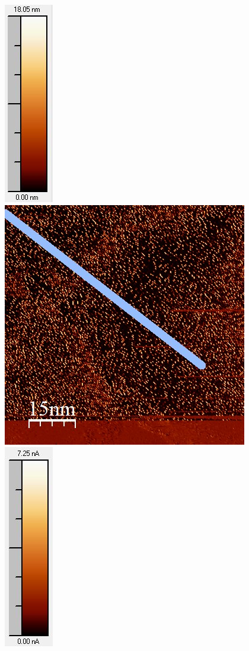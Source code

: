 \documentclass[12pt,a4paper]{article}
\begin{document}
\begin{figure}[H]
\includegraphics[scale=0.6]{Bilder/Anhang/IGain/11000_IGain_nach_Skala.jpg}
\includegraphics[scale=0.6]{Bilder/Anhang/IGain/Strom/11000_IGain_Strom_vor.jpg}
\includegraphics[scale=0.6]{Bilder/Anhang/IGain/Strom/11000_IGain_Strom_vor_Skala.jpg}

\end{figure}
\end{document}
